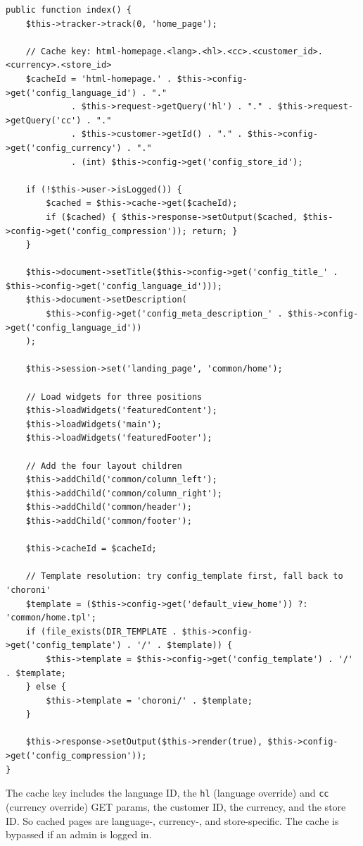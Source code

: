 \documentclass[11pt,a4paper]{article}
\begin{document}
\begin{lstlisting}[caption={\texttt{ControllerCommonHome::index()} --- the home page composition (abridged).},label={lst:home}]
public function index() {
    $this->tracker->track(0, 'home_page');

    // Cache key: html-homepage.<lang>.<hl>.<cc>.<customer_id>.<currency>.<store_id>
    $cacheId = 'html-homepage.' . $this->config->get('config_language_id') . "."
             . $this->request->getQuery('hl') . "." . $this->request->getQuery('cc') . "."
             . $this->customer->getId() . "." . $this->config->get('config_currency') . "."
             . (int) $this->config->get('config_store_id');

    if (!$this->user->isLogged()) {
        $cached = $this->cache->get($cacheId);
        if ($cached) { $this->response->setOutput($cached, $this->config->get('config_compression')); return; }
    }

    $this->document->setTitle($this->config->get('config_title_' . $this->config->get('config_language_id')));
    $this->document->setDescription(
        $this->config->get('config_meta_description_' . $this->config->get('config_language_id'))
    );

    $this->session->set('landing_page', 'common/home');

    // Load widgets for three positions
    $this->loadWidgets('featuredContent');
    $this->loadWidgets('main');
    $this->loadWidgets('featuredFooter');

    // Add the four layout children
    $this->addChild('common/column_left');
    $this->addChild('common/column_right');
    $this->addChild('common/header');
    $this->addChild('common/footer');

    $this->cacheId = $cacheId;

    // Template resolution: try config_template first, fall back to 'choroni'
    $template = ($this->config->get('default_view_home')) ?: 'common/home.tpl';
    if (file_exists(DIR_TEMPLATE . $this->config->get('config_template') . '/' . $template)) {
        $this->template = $this->config->get('config_template') . '/' . $template;
    } else {
        $this->template = 'choroni/' . $template;
    }

    $this->response->setOutput($this->render(true), $this->config->get('config_compression'));
}
\end{lstlisting}

The cache key includes the language ID, the \texttt{hl} (language
override) and \texttt{cc} (currency override) GET params, the
customer ID, the currency, and the store ID. So cached pages are
language-, currency-, and store-specific. The cache is bypassed
if an admin is logged in.
\end{document}
